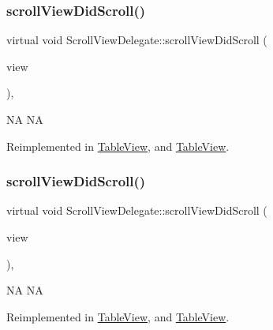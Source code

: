 \subsubsection{\texorpdfstring{scroll\+View\+Did\+Scroll()}{scrollViewDidScroll()}\hspace{0.1cm}{\footnotesize\ttfamily [1/2]}}
{\footnotesize\ttfamily virtual void Scroll\+View\+Delegate\+::scroll\+View\+Did\+Scroll (\begin{DoxyParamCaption}\item[{\hyperlink{classScrollView}{Scroll\+View} $\ast$}]{view }\end{DoxyParamCaption})\hspace{0.3cm}{\ttfamily [inline]}, {\ttfamily [virtual]}}

NA  NA 

Reimplemented in \hyperlink{classTableView_a021ba3adef24829362018d36f4a08621}{Table\+View}, and \hyperlink{classTableView_ac81b28599ca1bad73bf28b8d2e3d72bf}{Table\+View}.

\mbox{\label{classScrollViewDelegate_acdb3346314b9769c08add984a2abe0f8}} 
\subsubsection{\texorpdfstring{scroll\+View\+Did\+Scroll()}{scrollViewDidScroll()}\hspace{0.1cm}{\footnotesize\ttfamily [2/2]}}
{\footnotesize\ttfamily virtual void Scroll\+View\+Delegate\+::scroll\+View\+Did\+Scroll (\begin{DoxyParamCaption}\item[{\hyperlink{classScrollView}{Scroll\+View} $\ast$}]{view }\end{DoxyParamCaption})\hspace{0.3cm}{\ttfamily [inline]}, {\ttfamily [virtual]}}

NA  NA 

Reimplemented in \hyperlink{classTableView_a021ba3adef24829362018d36f4a08621}{Table\+View}, and \hyperlink{classTableView_ac81b28599ca1bad73bf28b8d2e3d72bf}{Table\+View}.

\mbox{\label{classScrollViewDelegate_a442695e2f1b1d9ee3959a0a5e8d1bd03}} 
